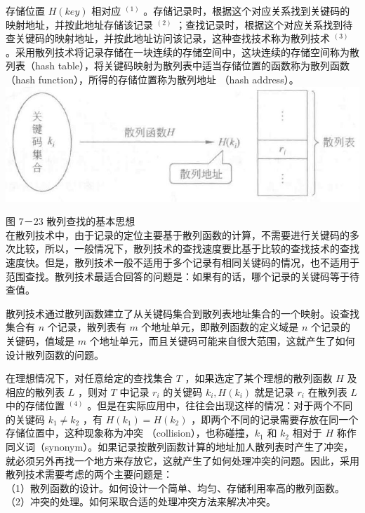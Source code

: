 \documentclass[10pt]{article}
\begin{document}
存储位置 $H(k e y)$ 相对应 ${ }^{(1)}$ 。存储记录时，根据这个对应关系找到关键码的映射地址，并按此地址存储该记录 ${ }^{(2)}$ ；查找记录时，根据这个对应关系找到待查关键码的映射地址，并按此地址访问该记录，这种查找技术称为散列技术 ${ }^{(3)}$ 。采用散列技术将记录存储在一块连续的存储空间中，这块连续的存储空间称为散列表（hash table），将关键码映射为散列表中适当存储位置的函数称为散列函数（hash function），所得的存储位置称为散列地址 （hash address）。\\
\includegraphics[max width=\textwidth, center]{2025_06_06_704745ea57b15b2333e5g-253}

图 7－23 散列查找的基本思想\\
在散列技术中，由于记录的定位主要基于散列函数的计算，不需要进行关键码的多次比较，所以，一般情况下，散列技术的查找速度要比基于比较的查找技术的查找速度快。但是，散列技术一般不适用于多个记录有相同关键码的情况，也不适用于范围查找。散列技术最适合回答的问题是：如果有的话，哪个记录的关键码等于待查值。

散列技术通过散列函数建立了从关键码集合到散列表地址集合的一个映射。设查找集合有 $n$ 个记录，散列表有 $m$ 个地址单元，即散列函数的定义域是 $n$ 个记录的关键码，值域是 $m$ 个地址单元，而且关键码可能来自很大范围，这就产生了如何设计散列函数的问题。

在理想情况下，对任意给定的查找集合 $T$ ，如果选定了某个理想的散列函数 $H$ 及相应的散列表 $L$ ，则对 $T$ 中记录 $r_{i}$ 的关键码 $k_{i}, H\left(k_{i}\right)$ 就是记录 $r_{i}$ 在散列表 $L$ 中的存储位置 ${ }^{(4)}$ 。但是在实际应用中，往往会出现这样的情况：对于两个不同的关键码 $k_{1} \neq k_{2}$ ，有 $H\left(k_{1}\right)=H\left(k_{2}\right)$ ，即两个不同的记录需要存放在同一个存储位置中，这种现象称为冲突 （collision），也称碰撞，$k_{1}$ 和 $k_{2}$ 相对于 $H$ 称作同义词（synonym）。如果记录按散列函数计算的地址加人散列表时产生了冲突，就必须另外再找一个地方来存放它，这就产生了如何处理冲突的问题。因此，采用散列技术需要考虑的两个主要问题是：\\
（1）散列函数的设计。如何设计一个简单、均匀、存储利用率高的散列函数。\\
（2）冲突的处理。如何采取合适的处理冲突方法来解决冲突。
\end{document}
